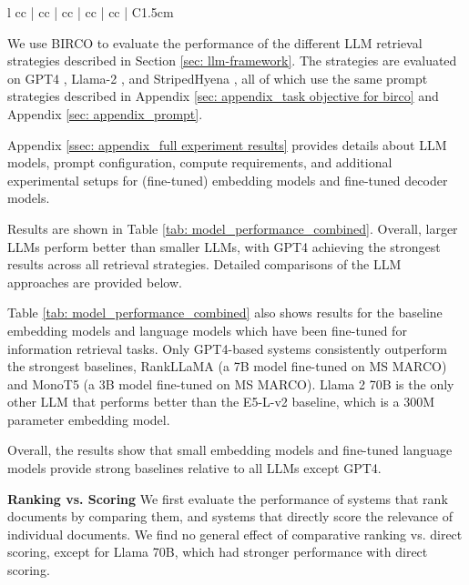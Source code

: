 \documentclass[11pt]{article}
\begin{document}
\begin{table}
\begin{tabular}{l cc | cc | cc | cc | cc | C{1.5cm}}
\end{tabular}

\caption{nDCG@10 and Recall@5 for the benchmark datasets. \textbf{Bold} indicates no statistically significant difference from the \underline{\textcolor{red}{highest numerical value}}, which is indicated in red. Refer to Appendix Table \ref{tab: model_performance_combined_app} for standard errors. The notation $+$O indicates task objective awareness. The consistently low recall on DORIS-MAE and Clinical-Trial corresponds to their low maximum possible recall.}

\label{tab: model_performance_combined}

\end{table}

We use BIRCO to evaluate the performance of the different LLM retrieval strategies described in Section \ref{sec: llm-framework}. The strategies are evaluated on GPT4 \cite{openai2023gpt4}, Llama-2 \cite{llama2}, and StripedHyena \cite{StripedHyena}, all of which use the same prompt strategies described in Appendix \ref{sec: appendix_task objective for birco} and Appendix \ref{sec: appendix_prompt}.

Appendix \ref{ssec: appendix_full experiment results} provides details about LLM models, prompt configuration, compute requirements, and additional experimental setups for (fine-tuned) embedding models and fine-tuned decoder models.

Results are shown in Table \ref{tab: model_performance_combined}. Overall, larger LLMs perform better than smaller LLMs, with GPT4 achieving the strongest results across all retrieval strategies. Detailed comparisons of the LLM approaches are provided below.

Table \ref{tab: model_performance_combined} also shows results for the baseline embedding models and language models which have been fine-tuned for information retrieval tasks. Only GPT4-based systems consistently outperform the strongest baselines, RankLLaMA (a 7B model fine-tuned on MS MARCO) and MonoT5 (a 3B model fine-tuned on MS MARCO). Llama 2 70B is the only other LLM that performs better than the E5-L-v2 baseline, which is a 300M parameter embedding model.

Overall, the results show that small embedding models and fine-tuned language models provide strong baselines relative to all LLMs except GPT4. 

\textbf{Ranking vs. Scoring}
We first evaluate the performance of systems that rank documents by comparing them, and systems that directly score the relevance of individual documents. We find no general effect of comparative ranking vs. direct scoring, except for Llama 70B, which had stronger performance with direct scoring. 
\end{document}
